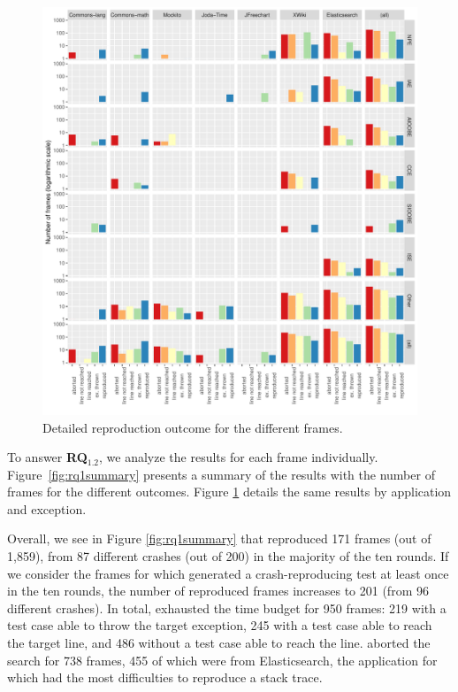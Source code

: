 \begin{figure}[t]
	\centering
	\includegraphics[width=\textwidth]{papers/jcrashpack/rq1_all.pdf}
	\caption{Detailed reproduction outcome for the different frames.}
	\label{figure:outcomecomp}
\end{figure}

To answer \textbf{RQ$_{1.2}$}, we analyze the results for each frame individually.
%
Figure~\ref{fig:rq1summary} presents a summary of the results with the number of frames for the different outcomes. Figure \ref{figure:outcomecomp} details the same results by application and exception. 

Overall, we see in Figure \ref{fig:rq1summary} that \evocrash reproduced 171 frames (out of 1,859), from 87 different crashes (out of 200) in the majority of the ten rounds. If we consider the frames for which \evocrash generated a crash-reproducing test at least once in the ten rounds, the number of reproduced frames increases to 201 (from 96 different crashes).
%
In total, \evocrash exhausted the time budget for 950 frames: 219 with a test case able to throw the target exception, 245 with a test case able to reach the target line, and 486 without a test case able to reach the line. 
\evocrash aborted the search for 738 frames, 455 of which were from Elasticsearch, the application for which \evocrash had the most difficulties to reproduce a stack trace. 

